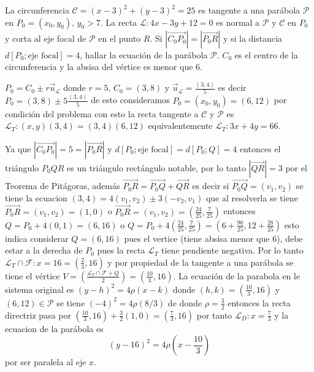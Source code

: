 \documentclass[10pt,]{krantz}
\theoremstyle{definition}
\theoremstyle{definition}
\theoremstyle{definition}
\theoremstyle{remark}
\let\BeginKnitrBlock\begin \let\EndKnitrBlock\end
\begin{document}
\BeginKnitrBlock{exercise}
\protect\hypertarget{exr:unnamed-chunk-4}{}{\label{exr:unnamed-chunk-4} }La circunferencia \(\mathcal{C}=(x-3)^2+(y-3)^2=25\) es tangente a una parábola \(\mathcal{P}\) en \(P_0=(x_0,y_0)\), \(y_0>7\). La recta \(\mathcal{L}:4x-3y+12=0\) es normal a \(\mathcal{P}\) y \(\mathcal{C}\) en \(P_0\) y corta al eje focal de \(\mathcal{P}\) en el punto \(R\). Si \(\left|\vec{C_0P_0}\right|=\left|\vec{P_0R}\right|\) y si la distancia \(d[P_0; \text{eje focal}]=4\), hallar la ecuación de la parábola \(\mathcal{P}\). \(C_0\) es el centro de la circunferencia y la absisa del vértice es menor que 6.
\EndKnitrBlock{exercise}

\BeginKnitrBlock{solution}
{}\(P_0=C_0\pm r\vec{u}_{\mathcal{L}}\) donde \(r=5\), \(C_0=(3,8)\) y \(\vec{u}_{\mathcal{L}}=\frac{(3,4)}{5}\) es decir \(P_0=(3,8)\pm 5\frac{(3,4)}{5}\) de esto consideramos \(P_0=(x_0,y_0)=(6,12)\) por condición del problema con esto la recta tangente a \(\mathcal{C}\) y \(\mathcal{P}\) es \(\mathcal{L}_T:(x,y)(3,4)=(3,4)(6,12)\) equivalentemente \(\mathcal{L}_T:3x+4y=66\).

Ya que \(\left|\vec{C_0P_0}\right|=5=\left|\vec{P_0R}\right|\) y \(d[P_0;\text{eje focal}]=d[P_0; Q]=4\) entonces el triángulo \(P_0QR\) es un triángulo rectángulo notable, por lo tanto \(\left|\vec{QR}\right|=3\) por el Teorema de Pitágoras, además \(\vec{P_0R}=\vec{P_0Q}+\vec{QR}\) es decir si \(\vec{P_0Q}=(v_1,v_2)\) se tiene la ecuacion \((3,4)=4(v_1,v_2)\pm 3(-v_2,v_1)\) que al resolverla se tiene \(\vec{P_0R}=(v_1,v_2)=(1,0)\) o \(\vec{P_0R}=(v_1,v_2)=\left(\frac{24}{25},\frac{7}{25}\right)\) entonces \(Q=P_0+4(0,1)=(6,16)\) o \(Q=P_0+4\left(\frac{24}{25},\frac{7}{25}\right)=\left(6+\frac{96}{25},12+\frac{28}{25}\right)\) esto indica considerar \(Q=(6,16)\) pues el vertice (tiene absisa menor que 6), debe estar a la derecha de \(P_0\) pues la recta \(\mathcal{L}_T\) tiene pendiente negativa. Por lo tanto \(\mathcal{L}_T\cap \mathcal{F}:x=16=(\frac{2}{3},16)\) y por propiedad de la tangente a una parábola se tiene el vértice \(V=\left(\frac{\mathcal{L}_T\cap \mathcal{F}+Q}{2}\right)=\left(\frac{10}{3}, 16\right)\). La ecuación de la parabola en le sistema original es \((y-h)^2=4\rho(x-k)\) donde \((h,k)=\left(\frac{10}{3}, 16\right)\) y \((6,12)\in\mathcal{P}\) se tiene \((-4)^2=4\rho(8/3)\) de donde \(\rho=\frac{3}{2}\) entonces la recta directriz pasa por \(\left(\frac{10}{3}, 16\right)+\frac{3}{2}(1,0)=\left(\frac{7}{3}, 16\right)\) por tanto \(\mathcal{L}_D:x=\frac{7}{3}\) y la ecuacion de la parábola es \[(y-16)^2=4\rho\left(x-\frac{10}{3}\right)\] por ser paralela al eje \(x.\)
\EndKnitrBlock{solution}
\end{document}
